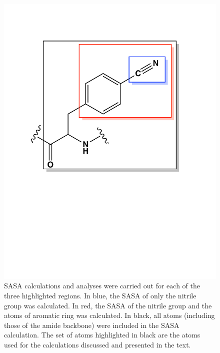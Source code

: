 \begin{figure}
    \center
    \includegraphics[width=\single]{figures-gfp-hbond/sasa_regions_aromatic.pdf}
    \caption[Schematic of regions used for SASA calculations]{
        SASA calculations and analyses were carried out for each of the three highlighted regions. 
        In blue, the SASA of only the nitrile group was calculated. 
        In red, the SASA of the nitrile group and the atoms of aromatic ring was calculated. 
        In black, all atoms (including those of the amide backbone) were included in the SASA calculation. 
        The set of atoms highlighted in black are the atoms used for the calculations discussed and presented in the text.
    }
    \label{fig:hbond-sasa_regions}
\end{figure}

